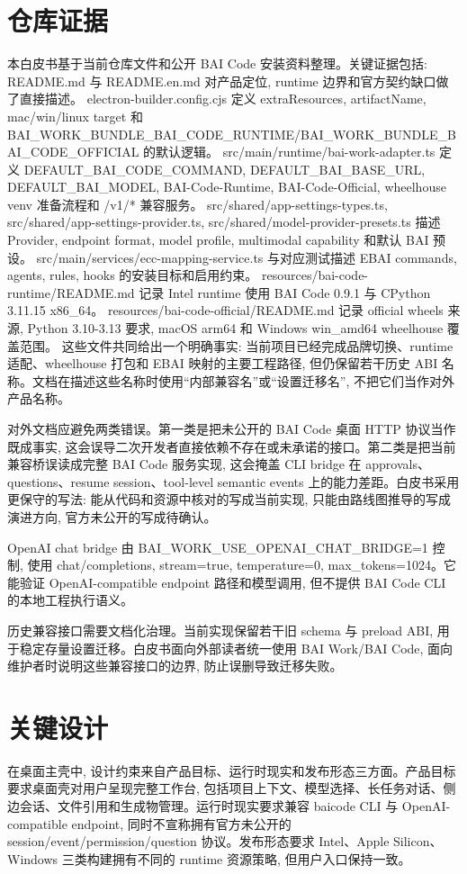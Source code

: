 \section{仓库证据}
本白皮书基于当前仓库文件和公开 BAI Code 安装资料整理。关键证据包括: README.md 与 README.en.md 对产品定位, runtime 边界和官方契约缺口做了直接描述。 electron-builder.config.cjs 定义 extraResources, artifactName, mac/win/linux target 和 BAI\_WORK\_BUNDLE\_BAI\_CODE\_RUNTIME/BAI\_WORK\_BUNDLE\_BAI\_CODE\_OFFICIAL 的默认逻辑。 src/main/runtime/bai-work-adapter.ts 定义 DEFAULT\_BAI\_CODE\_COMMAND, DEFAULT\_BAI\_BASE\_URL, DEFAULT\_BAI\_MODEL, BAI-Code-Runtime, BAI-Code-Official, wheelhouse venv 准备流程和 /v1/* 兼容服务。 src/shared/app-settings-types.ts, src/shared/app-settings-provider.ts, src/shared/model-provider-presets.ts 描述 Provider, endpoint format, model profile, multimodal capability 和默认 BAI 预设。 src/main/services/ecc-mapping-service.ts 与对应测试描述 EBAI commands, agents, rules, hooks 的安装目标和启用约束。 resources/bai-code-runtime/README.md 记录 Intel runtime 使用 BAI Code 0.9.1 与 CPython 3.11.15 x86\_64。 resources/bai-code-official/README.md 记录 official wheels 来源, Python 3.10-3.13 要求, macOS arm64 和 Windows win\_amd64 wheelhouse 覆盖范围。 这些文件共同给出一个明确事实: 当前项目已经完成品牌切换、runtime 适配、wheelhouse 打包和 EBAI 映射的主要工程路径, 但仍保留若干历史 ABI 名称。文档在描述这些名称时使用“内部兼容名”或“设置迁移名”, 不把它们当作对外产品名称。

对外文档应避免两类错误。第一类是把未公开的 BAI Code 桌面 HTTP 协议当作既成事实, 这会误导二次开发者直接依赖不存在或未承诺的接口。第二类是把当前兼容桥误读成完整 BAI Code 服务实现, 这会掩盖 CLI bridge 在 approvals、questions、resume session、tool-level semantic events 上的能力差距。白皮书采用更保守的写法: 能从代码和资源中核对的写成当前实现, 只能由路线图推导的写成演进方向, 官方未公开的写成待确认。

OpenAI chat bridge 由 BAI\_WORK\_USE\_OPENAI\_CHAT\_BRIDGE=1 控制, 使用 chat/completions, stream=true, temperature=0, max\_tokens=1024。它能验证 OpenAI-compatible endpoint 路径和模型调用, 但不提供 BAI Code CLI 的本地工程执行语义。

历史兼容接口需要文档化治理。当前实现保留若干旧 schema 与 preload ABI, 用于稳定存量设置迁移。白皮书面向外部读者统一使用 BAI Work/BAI Code, 面向维护者时说明这些兼容接口的边界, 防止误删导致迁移失败。

\section{关键设计}
在桌面主壳中, 设计约束来自产品目标、运行时现实和发布形态三方面。产品目标要求桌面壳对用户呈现完整工作台, 包括项目上下文、模型选择、长任务对话、侧边会话、文件引用和生成物管理。运行时现实要求兼容 baicode CLI 与 OpenAI-compatible endpoint, 同时不宣称拥有官方未公开的 session/event/permission/question 协议。发布形态要求 Intel、Apple Silicon、Windows 三类构建拥有不同的 runtime 资源策略, 但用户入口保持一致。

